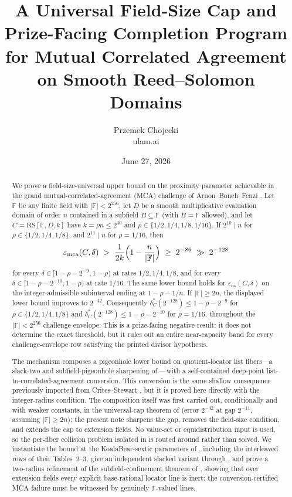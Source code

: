 \documentclass[11pt]{article}
\title{A Universal Field-Size Cap and Prize-Facing Completion Program\\ for Mutual Correlated Agreement on Smooth Reed--Solomon Domains}
\author{Przemek Chojecki\\ \small ulam.ai}
\date{June 27, 2026}
\theoremstyle{definition}
\theoremstyle{remark}
\newcommand{\F}{\mathbb{F}}
\newcommand{\B}{B}
\newcommand{\RS}{\mathrm{RS}}
\newcommand{\eca}{\varepsilon_{\mathrm{ca}}}
\newcommand{\emca}{\varepsilon_{\mathrm{mca}}}
\begin{document}
\maketitle

\begin{abstract}
We prove a field-size-universal upper bound on the proximity parameter achievable in the grand mutual-correlated-agreement (MCA) challenge of Arnon--Boneh--Fenzi \cite{ABF26}. Let $\F$ be any finite field with $|\F|<2^{256}$, let $D$ be a smooth multiplicative evaluation domain of order $n$ contained in a subfield $\B\subseteq\F$ (with $\B=\F$ allowed), and let $C=\RS[\F,D,k]$ have $k=\rho n\le2^{40}$ and $\rho\in\{1/2,1/4,1/8,1/16\}$. If $2^{10}\mid n$ for $\rho\in\{1/2,1/4,1/8\}$, and $2^{11}\mid n$ for $\rho=1/16$, then
\[
\emca(C,\delta)
\;>\;\frac{1}{2k}\Bigl(1-\frac n{|\F|}\Bigr)
\;\ge\;2^{-86}\;\gg\;2^{-128}
\]
for every $\delta\in[1-\rho-2^{-9},1-\rho)$ at rates $1/2,1/4,1/8$, and for every $\delta\in[1-\rho-2^{-10},1-\rho)$ at rate $1/16$. The same lower bound holds for $\eca(C,\delta)$ on the integer-admissible subinterval ending at $1-\rho-1/n$. If $|\F|\ge2n$, the displayed lower bound improves to $2^{-42}$. Consequently $\delta^*_C(2^{-128})\le 1-\rho-2^{-9}$ for $\rho\in\{1/2,1/4,1/8\}$ and $\delta^*_C(2^{-128})\le 1-\rho-2^{-10}$ for $\rho=1/16$, throughout the $|\F|<2^{256}$ challenge envelope. This is a prize-facing negative result: it does not determine the exact threshold, but it rules out an entire near-capacity band for every challenge-envelope row satisfying the printed divisor hypothesis.

The mechanism composes a pigeonhole lower bound on quotient-locator list fibers---a slack-two and subfield-pigeonhole sharpening of \cite[Main Thm.\,(d)]{Cho26a}---with a self-contained deep-point list-to-correlated-agreement conversion. This conversion is the same shallow consequence previously imported from Crites--Stewart \cite[Thm.~2]{CS25}, but it is proved here directly with the integer-radius condition. The composition itself was first carried out, conditionally and with weaker constants, in the universal-cap theorem of \cite{Cho26b} (error $2^{-42}$ at gap $2^{-11}$, assuming $|\F|\ge2n$); the present note sharpens the gap, removes the field-size condition, and extends the cap to extension fields. No value-set or equidistribution input is used, so the per-fiber collision problem isolated in \cite{Cho26b} is routed around rather than solved. We instantiate the bound at the KoalaBear-sextic parameters of \cite[\S6.3]{ABF26}, including the interleaved rows of their Tables~2--3, give an independent slacked variant through \cite[Thm.~1.9]{BCHKS25}, and prove a two-radius refinement of the subfield-confinement theorem of \cite{Cho26b}, showing that over extension fields every explicit base-rational locator line is inert: the conversion-certified MCA failure must be witnessed by genuinely $\F$-valued lines.
\end{abstract}
\end{document}
